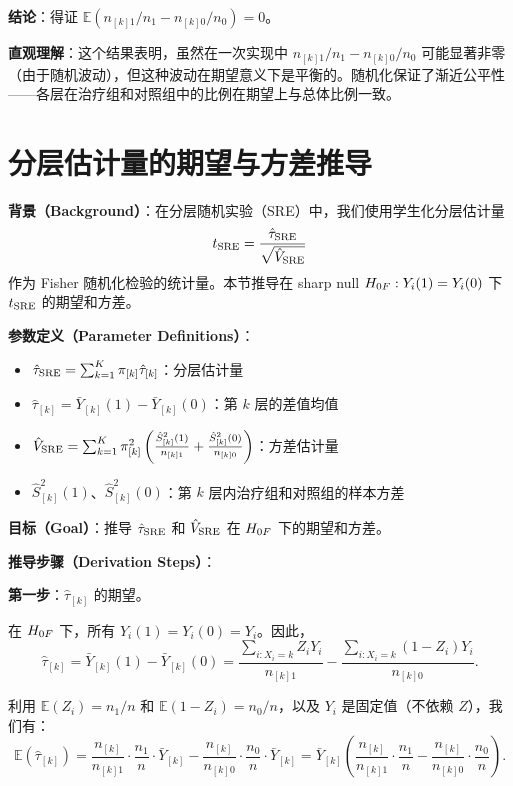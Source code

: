\textbf{结论}：得证 $\mathbb{E}\left( n_{[k]1}/n_1 - n_{[k]0}/n_0 \right) = 0$。

\textbf{直观理解}：这个结果表明，虽然在一次实现中 $n_{[k]1}/n_1 - n_{[k]0}/n_0$ 可能显著非零（由于随机波动），但这种波动在期望意义下是平衡的。随机化保证了渐近公平性——各层在治疗组和对照组中的比例在期望上与总体比例一致。

\section{分层估计量的期望与方差推导}\label{sec:appendix-5-8}\label{sec:appendix-5-stratum-variance}\label{sec:appendix-5-studentized-t}

\textbf{背景（Background）}：在分层随机实验（SRE）中，我们使用学生化分层估计量
\[
t_{\text{SRE}} = \frac{\hat{\tau}_{\text{SRE}}}{\sqrt{\hat{V}_{\text{SRE}}}}
\]
作为 Fisher 随机化检验的统计量。本节推导在 sharp null $H_{0F}: Y_i(1) = Y_i(0)$ 下 $t_{\text{SRE}}$ 的期望和方差。

\textbf{参数定义（Parameter Definitions）}：
\begin{itemize}
  \item $\hat{\tau}_{\text{SRE}} = \sum_{k=1}^K \pi_{[k]} \hat{\tau}_{[k]}$：分层估计量
  \item $\hat{\tau}_{[k]} = \bar{Y}_{[k]}(1) - \bar{Y}_{[k]}(0)$：第 $k$ 层的差值均值
  \item $\hat{V}_{\text{SRE}} = \sum_{k=1}^K \pi_{[k]}^2 \left( \frac{\hat{S}_{[k]}^2(1)}{n_{[k]1}} + \frac{\hat{S}_{[k]}^2(0)}{n_{[k]0}} \right)$：方差估计量
  \item $\hat{S}_{[k]}^2(1)$、$\hat{S}_{[k]}^2(0)$：第 $k$ 层内治疗组和对照组的样本方差
\end{itemize}

\textbf{目标（Goal）}：推导 $\hat{\tau}_{\text{SRE}}$ 和 $\hat{V}_{\text{SRE}}$ 在 $H_{0F}$ 下的期望和方差。

\textbf{推导步骤（Derivation Steps）}：

\textbf{第一步}：$\hat{\tau}_{[k]}$ 的期望。

在 $H_{0F}$ 下，所有 $Y_i(1) = Y_i(0) = Y_i$。因此，
\[
\hat{\tau}_{[k]} = \bar{Y}_{[k]}(1) - \bar{Y}_{[k]}(0) = \frac{\sum_{i: X_i=k} Z_i Y_i}{n_{[k]1}} - \frac{\sum_{i: X_i=k} (1-Z_i) Y_i}{n_{[k]0}}.
\]

利用 $\mathbb{E}(Z_i) = n_1/n$ 和 $\mathbb{E}(1-Z_i) = n_0/n$，以及 $Y_i$ 是固定值（不依赖 $Z$），我们有：
\[
\mathbb{E}(\hat{\tau}_{[k]}) = \frac{n_{[k]}}{n_{[k]1}} \cdot \frac{n_1}{n} \cdot \bar{Y}_{[k]} - \frac{n_{[k]}}{n_{[k]0}} \cdot \frac{n_0}{n} \cdot \bar{Y}_{[k]} = \bar{Y}_{[k]} \left( \frac{n_{[k]}}{n_{[k]1}} \cdot \frac{n_1}{n} - \frac{n_{[k]}}{n_{[k]0}} \cdot \frac{n_0}{n} \right).
\]

